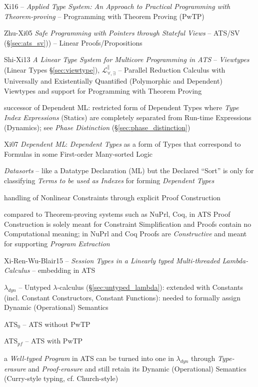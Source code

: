 Xi16 -- \emph{Applied Type System: An Approach to Practical
  Programming with Theorem-proving} -- Programming with Theorem
Proving (PwTP)

Zhu-Xi05 \emph{Safe Programming with Pointers through Stateful
  Views} -- ATS/SV (\S\ref{sec:ats_sv})) -- Linear Proofs/Propositions

Shi-Xi13 \emph{A Linear Type System for Multicore Programming in ATS}
-- \emph{Viewtypes} (Linear Types \S\ref{sec:viewtype}),
$\mathcal{L}^\parallel_{\forall, \exists}$ -- Parallel Reduction
Calculus with Universally and Existentially Quantified (Polymorphic
and Dependent) Viewtypes and support for Programming with Theorem
Proving

successor of Dependent ML: restricted form of Dependent Types where
\emph{Type Index Expressions} (Statics) are completely separated from
Run-time Expressions (Dynamics); see \emph{Phase Distinction}
(\S\ref{sec:phase_distinction})

Xi07 \emph{Dependent ML}: \emph{Dependent Types} as a form of Types
that correspond to Formulas in some First-order Many-sorted Logic %

\emph{Datasorts} -- like a Datatype Declaration (ML) but the Declared
``Sort'' is only for classifying \emph{Terms to be used as Indexes}
for forming \emph{Dependent Types}

handling of Nonlinear Constraints through explicit Proof Construction

compared to Theorem-proving systems such as NuPrl, Coq, in ATS Proof
Construction is solely meant for Constraint Simplification and Proofs
contain no Computational meaning; in NuPrl and Coq Proofs are
\emph{Constructive} and meant for supporting \emph{Program Extraction}

\fist Xi-Ren-Wu-Blair15 -- \emph{Session Types in a Linearly typed
  Multi-threaded Lambda-Calculus} -- embedding in ATS

$\lambda_{dyn}$ -- Untyped $\lambda$-calculus
(\S\ref{sec:untyped_lambda}): extended with Constants (incl. Constant
Constructors, Constant Functions): needed to formally assign Dynamic
(Operational) Semantics

ATS$_0$ -- ATS without PwTP

ATS$_{pf}$ -- ATS with PwTP

a \emph{Well-typed Program} in ATS can be turned into one in
$\lambda_{dyn}$ through \emph{Type-erasure} and \emph{Proof-erasure}
and still retain its Dynamic (Operational) Semantics (Curry-style
typing, cf. Church-style)

